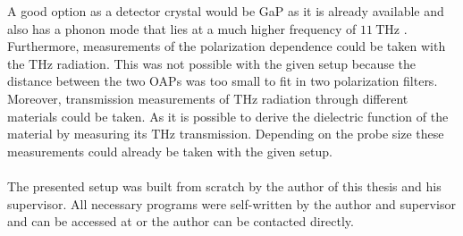 A good option as a detector crystal would be GaP as it is already available and also has a phonon mode that lies at a much higher frequency of $\SI{11}{\tera\hertz}$ \cite{phonon_GaP}.
\\
Furthermore, measurements of the polarization dependence could be taken with the $\si{\tera\hertz}$ radiation.
This was not possible with the given setup because the distance between the two OAPs was too small to fit in two polarization filters.
Moreover, transmission measurements of $\si{\tera\hertz}$ radiation through different materials could be taken.
As it is possible to derive the dielectric function of the material by measuring its $\si{\tera\hertz}$ transmission.
Depending on the probe size these measurements could already be taken with the given setup.
\\\\
The presented setup was built from scratch by the author of this thesis and his supervisor.
All necessary programs were self-written by the author and supervisor and can be accessed at \cite{github} or the author can be contacted directly.